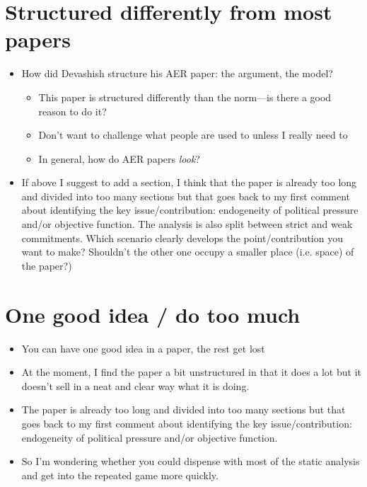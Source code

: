 \documentclass[12pt]{article}
\begin{document}
\section{Structured differently from most papers}
		\begin{itemize}
			\item How did Devashish structure his AER paper: the argument, the model?
				\begin{itemize}
					\item This paper is structured differently than the norm---is there a good reason to do it?
					\item Don't want to challenge what people are used to unless I really need to
					\item In general, how do AER papers \textit{look}?
				\end{itemize}
			\item If above I suggest to add a section, I think that the paper is already too long and divided into too many sections but that goes back to my first comment about identifying the key issue/contribution: endogeneity of political pressure and/or objective function. The analysis is also split between strict and weak commitments. Which scenario clearly develops the point/contribution you want to make? Shouldn't the other one occupy a smaller place (i.e. space) of the paper?)
		\end{itemize}
\section{One good idea / do too much}
		\begin{itemize}
			\item You can have one good idea in a paper, the rest get lost
			\item At the moment, I find the paper a bit unstructured in that it does a lot but it doesn't sell in a neat and clear way what it is doing.
			\item The paper is already too long and divided into too many sections but that goes back to my first comment about identifying the key issue/contribution: endogeneity of political pressure and/or objective function.
			\item So I'm wondering whether you could dispense with most of the static analysis and get into the repeated game more quickly.
		\end{itemize}
\end{document}
